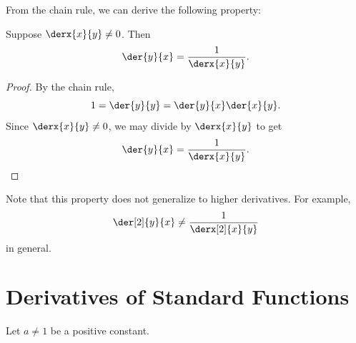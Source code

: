 From the chain rule, we can derive the following property:

\begin{proposition}
    Suppose $\derx{x}{y} \neq 0$. Then \[\der{y}{x} = \frac1{\derx{x}{y}}.\]
\end{proposition}
\begin{proof}
    By the chain rule, \[1 = \der{y}{y} = \der{y}{x} \der{x}{y}.\] Since $\derx{x}{y} \neq 0$, we may divide by $\derx{x}{y}$ to get \[\der{y}{x} = \frac1{\derx{x}{y}}.\]
\end{proof}

Note that this property does not generalize to higher derivatives. For example, \[\der[2]{y}{x} \neq \frac1{\derx[2]{x}{y}}\] in general.

\section{Derivatives of Standard Functions}

Let $a \neq 1$ be a positive constant.

